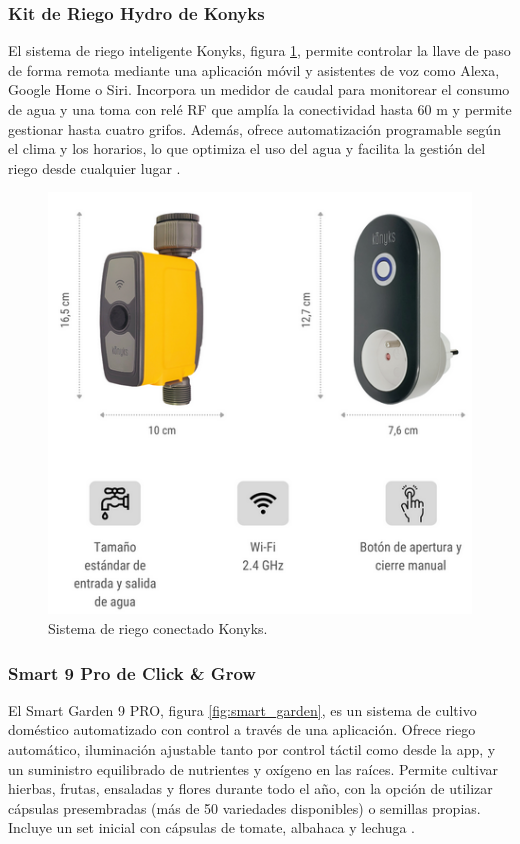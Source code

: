 \subsubsection{Kit de Riego Hydro de Konyks}
El sistema de riego inteligente Konyks, figura \ref{fig:kit_konyks}, permite controlar la llave de paso de forma remota mediante una aplicación móvil y asistentes de voz como Alexa, Google Home o Siri. Incorpora un medidor de caudal para monitorear el consumo de agua y una toma con relé RF que amplía la conectividad hasta 60 m y permite gestionar hasta cuatro grifos. Además, ofrece automatización programable según el clima y los horarios, lo que optimiza el uso del agua y facilita la gestión del riego desde cualquier lugar \cite{KONIX}.

\begin{figure}[H]
	\centering
	\includegraphics[scale=.5]{./Figures/kit_konyks.png}
	\caption{Sistema de riego conectado Konyks\protect\footnotemark.}
	\label{fig:kit_konyks}
\end{figure}






\subsubsection{Smart 9 Pro de Click \& Grow}
El Smart Garden 9 PRO, figura \ref{fig:smart_garden}, es un sistema de cultivo doméstico automatizado con control a través de una aplicación. Ofrece riego automático, iluminación ajustable tanto por control táctil como desde la app, y un suministro equilibrado de nutrientes y oxígeno en las raíces. Permite cultivar hierbas, frutas, ensaladas y flores durante todo el año, con la opción de utilizar cápsulas presembradas (más de 50 variedades disponibles) o semillas propias. Incluye un set inicial con cápsulas de tomate, albahaca y lechuga \cite{SMART:9}.

